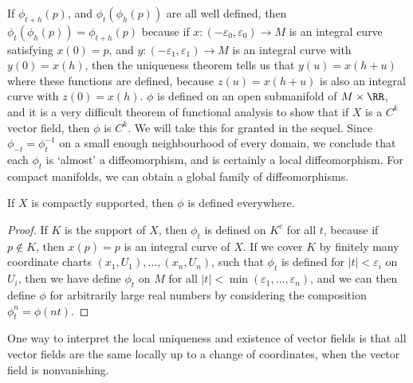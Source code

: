 If $\phi_{t+h}(p)$, and $\phi_t(\phi_h(p))$ are all well defined, then $\phi_t(\phi_h(p)) = \phi_{t + h}(p)$ because if $x: (-\varepsilon_0,\varepsilon_0) \to M$ is an integral curve satisfying $x(0) = p$, and $y: (-\varepsilon_1, \varepsilon_1) \to M$ is an integral curve with $y(0) = x(h)$, then the uniqueness theorem tells us that $y(u) = x(h + u)$ where these functions are defined, because $z(u) = x(h + u)$ is also an integral curve with $z(0) = x(h)$. $\phi$ is defined on an open submanifold of $M \times \RR$, and it is a very difficult theorem of functional analysis to show that if $X$ is a $C^k$ vector field, then $\phi$ is $C^k$. We will take this for granted in the sequel. Since $\phi_{-t} = \phi_t^{-1}$ on a small enough neighbourhood of every domain, we conclude that each $\phi_t$ is `almost' a diffeomorphism, and is certainly a local diffeomorphism. For compact manifolds, we can obtain a global family of diffeomorphisms.

\begin{theorem}
    If $X$ is compactly supported, then $\phi$ is defined everywhere.
\end{theorem}
\begin{proof}
    If $K$ is the support of $X$, then $\phi_t$ is defined on $K^c$ for all $t$, because if $p \not \in K$, then $x(p) = p$ is an integral curve of $X$. If we cover $K$ by finitely many coordinate charts $(x_1,U_1), \dots, (x_n,U_n)$, such that $\phi_t$ is defined for $|t| < \varepsilon_i$ on $U_i$, then we have define $\phi_t$ on $M$ for all $|t| < \min(\varepsilon_1, \dots, \varepsilon_n)$, and we can then define $\phi$ for arbitrarily large real numbers by considering the composition $\phi^n_t = \phi(nt)$.
\end{proof}

One way to interpret the local uniqueness and existence of vector fields is that all vector fields are the same locally up to a change of coordinates, when the vector field is nonvanishing.

